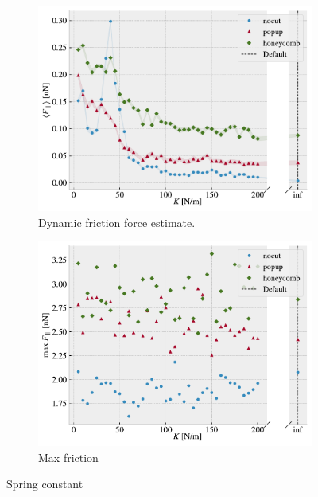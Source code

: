 \begin{figure}[H]
  \centering
  \begin{subfigure}[t]{0.49\textwidth}
      \centering
      \includegraphics[width=\textwidth]{figures/baseline/variables_spring_mean_fixmove.pdf}
      \caption{Dynamic friction force estimate.}
      \label{fig:var_K_mean}
  \end{subfigure}
  \hfill
  \begin{subfigure}[t]{0.49\textwidth}
      \centering
      \includegraphics[width=\textwidth]{figures/baseline/variables_spring_max_fixmove.pdf}
      \caption{Max friction}
      \label{fig:var_K_max}
  \end{subfigure}
  \hfill
     \caption{Spring constant}
     \label{fig:var_K}
\end{figure}



